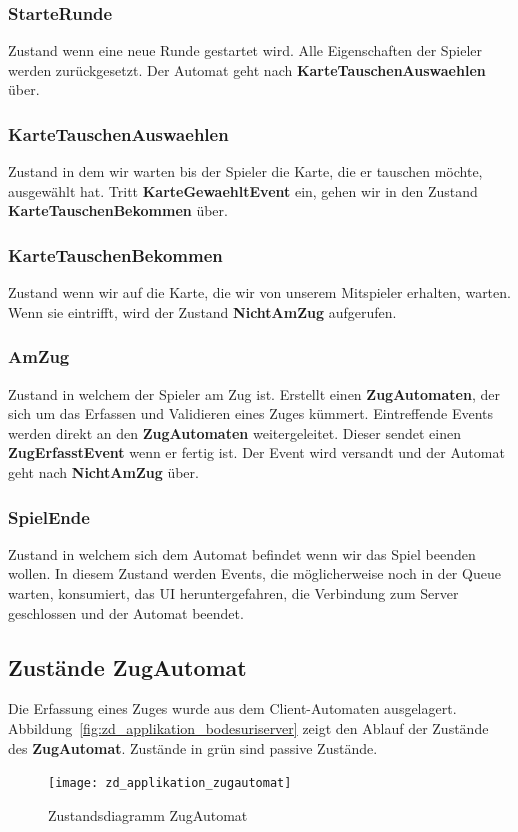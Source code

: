 \documentclass[12pt,halfparskip]{scrartcl}
\begin{document}
\subsubsection{StarteRunde}
\label{ssub:starterunde}
Zustand wenn eine neue Runde gestartet wird. Alle Eigenschaften der Spieler werden zurückgesetzt. Der Automat geht nach \textbf{KarteTauschenAuswaehlen} über.

\subsubsection{KarteTauschenAuswaehlen}
\label{ssub:kartetauschenauswaehlen}
Zustand in dem wir warten bis der Spieler die Karte, die er tauschen möchte, ausgewählt hat. Tritt \textbf{KarteGewaehltEvent} ein, gehen wir in den Zustand \textbf{KarteTauschenBekommen} über.

\subsubsection{KarteTauschenBekommen}
\label{ssub:kartetauschenbekommen}
Zustand wenn wir auf die Karte, die wir von unserem Mitspieler erhalten, warten. Wenn sie eintrifft, wird der Zustand \textbf{NichtAmZug} aufgerufen.

\subsubsection{AmZug}
\label{ssub:amzug}
Zustand in welchem der Spieler am Zug ist. Erstellt einen \textbf{ZugAutomaten}, der sich um das Erfassen und Validieren eines Zuges kümmert. Eintreffende Events werden direkt an den \textbf{ZugAutomaten} weitergeleitet. Dieser sendet einen \textbf{ZugErfasstEvent} wenn er fertig ist. Der Event wird versandt und der Automat geht nach \textbf{NichtAmZug} über.

\subsubsection{SpielEnde}
Zustand in welchem sich dem Automat befindet wenn wir das Spiel beenden wollen. In diesem Zustand werden Events, die möglicherweise noch in der Queue warten, konsumiert, das UI heruntergefahren, die Verbindung zum Server geschlossen und der Automat beendet.

\subsection{Zustände ZugAutomat}
\label{sub:zustände_zugautomat}
Die Erfassung eines Zuges wurde aus dem Client-Automaten ausgelagert. Abbildung~\vref{fig:zd_applikation_bodesuriserver} zeigt den Ablauf der Zustände des \textbf{ZugAutomat}. Zustände in grün sind passive Zustände.
\begin{figure}[h]
	\centering
	\texttt{[image: zd\_applikation\_zugautomat]}
	\caption{Zustandsdiagramm ZugAutomat}
	\label{fig:zd_applikation_zugautomat}
\end{figure}
\end{document}
